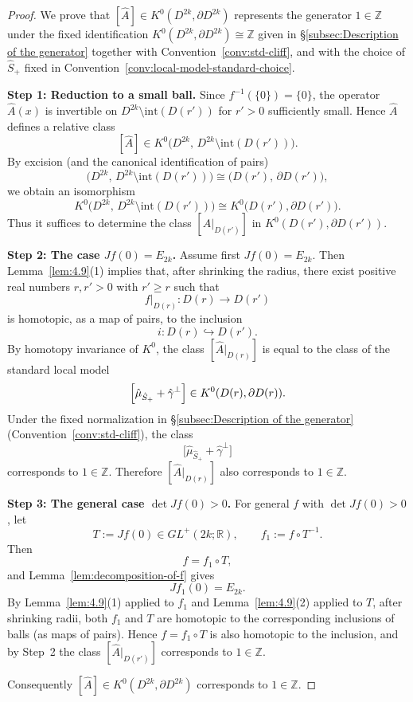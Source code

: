 \documentclass{amsart}
\theoremstyle{definition}
\theoremstyle{remark}
\begin{document}
\begin{proof}
We prove that $[\hat A]\in K^{0}(D^{2k},\partial D^{2k})$ represents the generator
$1\in\mathbb Z$ under the fixed identification $K^{0}(D^{2k},\partial D^{2k})\cong\mathbb Z$
given in \S\ref{subsec:Description of the generator} together with Convention~\ref{conv:std-cliff},
and with the choice of $\hat S_{+}$ fixed in Convention~\ref{conv:local-model-standard-choice}.

\smallskip
\noindent\textbf{Step 1: Reduction to a small ball.}
Since $f^{-1}(\{0\})=\{0\}$, the operator $\hat A(x)$ is invertible on
$D^{2k}\setminus \mathrm{int}(D(r'))$ for $r'>0$ sufficiently small.
Hence $\hat A$ defines a relative class
\[
[\hat A]\in K^{0}\bigl(D^{2k},\,D^{2k}\setminus \mathrm{int}(D(r'))\bigr).
\]
By excision (and the canonical identification of pairs)
\[
\bigl(D^{2k},\,D^{2k}\setminus \mathrm{int}(D(r'))\bigr)\cong \bigl(D(r'),\,\partial D(r')\bigr),
\]
we obtain an isomorphism
\[
K^{0}\bigl(D^{2k},\,D^{2k}\setminus \mathrm{int}(D(r'))\bigr)\cong K^{0}\bigl(D(r'),\partial D(r')\bigr).
\]
Thus it suffices to determine the class $[\hat A|_{D(r')}]$ in $K^{0}(D(r'),\partial D(r'))$.

\smallskip
\noindent\textbf{Step 2: The case $Jf(0)=E_{2k}$.}
Assume first $Jf(0)=E_{2k}$. Then Lemma~\ref{lem:4.9}(1) implies that, after shrinking the radius, there exist positive real numbers $r,r'>0$ with $r'\ge r$ such that
\[
f|_{D(r)}:D(r)\to D(r')
\]
is homotopic, as a map of pairs, to the inclusion
\[
i:D(r)\hookrightarrow D(r').
\]
By homotopy invariance of $K^{0}$, the class $[\hat A|_{D(r)}]$ is equal to the class of the
standard local model
\[
\Bigl[\hat\mu_{\hat S_{+}}+\hat\gamma^{\perp}\Bigr]\in K^{0}(D(r),\partial D(r)).
\]
Under the fixed normalization in \S\ref{subsec:Description of the generator}
(Convention~\ref{conv:std-cliff}), the class
\[
\bigl[\hat\mu_{\hat S_{+}}+\hat\gamma^{\perp}\bigr]
\]
corresponds to $1\in\mathbb Z$.
Therefore $[\hat A|_{D(r)}]$ also corresponds to $1\in\mathbb Z$.

\smallskip
\noindent\textbf{Step 3: The general case $\det Jf(0)>0$.}
For general $f$ with $\det Jf(0)>0$, let
\[
T:=Jf(0)\in GL^{+}(2k;\mathbb R),
\qquad
f_{1}:=f\circ T^{-1}.
\]
Then
\[
f=f_{1}\circ T,
\]
and Lemma~\ref{lem:decomposition-of-f} gives
\[
Jf_{1}(0)=E_{2k}.
\]
By Lemma~\ref{lem:4.9}(1) applied to $f_{1}$ and Lemma~\ref{lem:4.9}(2) applied to $T$,
after shrinking radii, both $f_{1}$ and $T$ are homotopic to the corresponding inclusions of balls (as maps of pairs).
Hence $f=f_{1}\circ T$ is also homotopic to the inclusion, and by Step~2 the class
$[\hat A|_{D(r')}]$ corresponds to $1\in\mathbb Z$.

Consequently $[\hat A]\in K^{0}(D^{2k},\partial D^{2k})$ corresponds to $1\in\mathbb Z$.
\end{proof}
\end{document}
